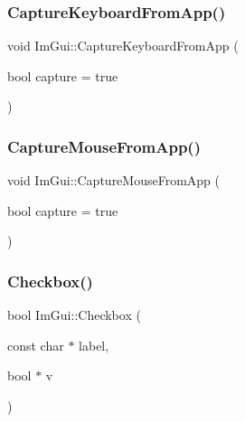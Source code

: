 \hypertarget{namespace_im_gui_af382f9360d73917a9e9c0d26b5797552}{}\label{namespace_im_gui_af382f9360d73917a9e9c0d26b5797552} 
\subsubsection{\texorpdfstring{Capture\+Keyboard\+From\+App()}{CaptureKeyboardFromApp()}}
{\footnotesize\ttfamily void Im\+Gui\+::\+Capture\+Keyboard\+From\+App (\begin{DoxyParamCaption}\item[{bool}]{capture = {\ttfamily true} }\end{DoxyParamCaption})}

\hypertarget{namespace_im_gui_a3a86fbf0d334b30dc16fb44955f1ce54}{}\label{namespace_im_gui_a3a86fbf0d334b30dc16fb44955f1ce54} 
\subsubsection{\texorpdfstring{Capture\+Mouse\+From\+App()}{CaptureMouseFromApp()}}
{\footnotesize\ttfamily void Im\+Gui\+::\+Capture\+Mouse\+From\+App (\begin{DoxyParamCaption}\item[{bool}]{capture = {\ttfamily true} }\end{DoxyParamCaption})}

\hypertarget{namespace_im_gui_a57d73c1d0ef807fef734d91024092027}{}\label{namespace_im_gui_a57d73c1d0ef807fef734d91024092027} 
\subsubsection{\texorpdfstring{Checkbox()}{Checkbox()}}
{\footnotesize\ttfamily bool Im\+Gui\+::\+Checkbox (\begin{DoxyParamCaption}\item[{const char $\ast$}]{label,  }\item[{bool $\ast$}]{v }\end{DoxyParamCaption})}

\hypertarget{namespace_im_gui_aeca400dcf5a82c312b3e669d2fe6e88d}{}\label{namespace_im_gui_aeca400dcf5a82c312b3e669d2fe6e88d} 
